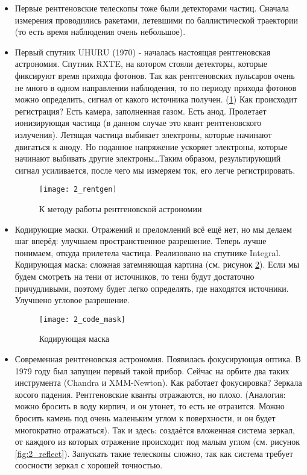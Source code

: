 \begin{itemize}
	\item Первые рентгеновские телескопы тоже были детекторами частиц. Сначала измерения проводились ракетами, летевшими по баллистической траектории (то есть время наблюдения очень небольшое). 
	
	\item Первый спутник UHURU (1970) - началась настоящая рентгеновская астрономия. Спутник RXTE, на котором стояли детекторы, которые фиксируют время прихода фотонов. Так как рентгеновских пульсаров очень не много в одном направлении наблюдения, то по периоду прихода фотонов можно определить, сигнал от какого источника получен. (\ref{fig:2_rentgen}) Как происходит регистрация? Есть камера, заполненная газом. Есть анод. Пролетает ионизирующая частица (в данном случае это квант рентгеновского излучения).  Летящая частица выбивает электроны, которые начинают двигаться к аноду. Но поданное напряжение ускоряет электроны, которые начинают выбивать другие электроны…Таким образом, результирующий сигнал усиливается, после чего мы измеряем ток, его легче регистрировать.
	
	\begin{figure}[H]
		\centering
		\texttt{[image: 2\_rentgen]}
		\caption{К методу работы рентгеновской астрономии}
		\label{fig:2_rentgen}
	\end{figure}
	
	\item Кодирующие маски. Отражений и преломлений всё ещё нет, но мы делаем шаг вперёд: улучшаем пространственное разрешение.  Теперь лучше понимаем, откуда прилетела частица. Реализовано на спутнике Integral. Кодирующая маска: сложная затемняющая картина (см. рисунок \ref{fig:2_code_mask}). Если мы будем смотреть на тени от источников, то тени будут достаточно причудливыми, поэтому будет легко  определять, где находятся источники. Улучшено угловое разрешение.
	
	\begin{figure}[H]
		\centering
		\texttt{[image: 2\_code\_mask]}
		\caption{Кодирующая маска}
		\label{fig:2_code_mask}
	\end{figure}
	
	\item Современная рентгеновская астрономия. Появилась фокусирующая оптика. В 1979 году был запущен первый такой прибор. Сейчас на орбите два таких инструмента (Chandra и XMM-Newton). Как работает фокусировка? Зеркала косого падения. Рентгеновские кванты отражаются, но плохо. (Аналогия: можно бросить в воду кирпич, и он утонет, то есть не отразится. Можно бросить камень под очень маленьким углом к поверхности, и он будет многократно отражаться). Так и здесь: создаётся вложенная система зеркал, от каждого из которых отражение происходит под малым углом (см. рисунок \ref{fig:2_reflect}). Запускать такие телескопы сложно, так как система требует соосности зеркал с хорошей точностью.
	

\end{itemize}
